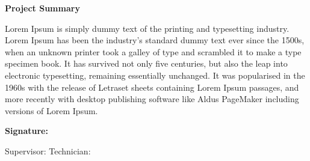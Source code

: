 \documentclass{article}
\begin{document}
\vspace{1em}

\begin{center}
    \textbf{Project Summary}
\end{center}

\vspace{1em}
Lorem Ipsum is simply dummy text of the printing and typesetting industry. Lorem Ipsum has been the industry's standard dummy text ever since the 1500s, when an unknown printer took a galley of type and scrambled it to make a type specimen book. It has survived not only five centuries, but also the leap into electronic typesetting, remaining essentially unchanged. It was popularised in the 1960s with the release of Letraset sheets containing Lorem Ipsum passages, and more recently with desktop publishing software like Aldus PageMaker including versions of Lorem Ipsum.


\vspace{1cm}

\noindent \textbf{Signature:}

\vspace{0.5cm}

\noindent Supervisor: \underline{\hspace{5cm}}\hfill Technician: \underline{\hspace{5cm}}
\end{document}
